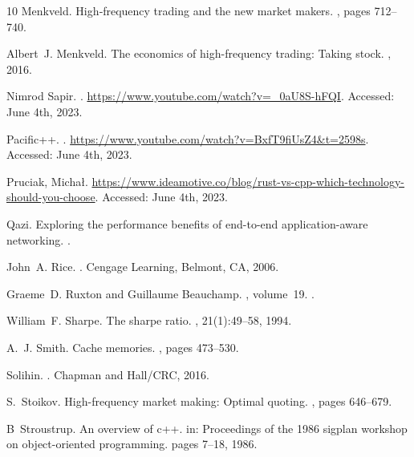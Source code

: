\documentclass{article}
\theoremstyle{break}
\begin{document}
\begin{thebibliography}{10}
Menkveld.
\newblock High‐frequency trading and the new market makers.
, pages 712--740.

Albert~J. Menkveld.
\newblock The economics of high-frequency trading: Taking stock.
, 2016.

{Nimrod Sapir}.
.
\newblock \url{https://www.youtube.com/watch?v=_0aU8S-hFQI}.
\newblock Accessed: June 4th, 2023.

{Pacific++}.
.
\newblock \url{https://www.youtube.com/watch?v=BxfT9fiUsZ4&t=2598s}.
\newblock Accessed: June 4th, 2023.

{Pruciak, Michał}.
\newblock \url{https://www.ideamotive.co/blog/rust-vs-cpp-which-technology-should-you-choose}.
\newblock Accessed: June 4th, 2023.

Qazi.
\newblock Exploring the performance benefits of end-to-end application-aware networking.
.

John~A. Rice.
.
\newblock Cengage Learning, Belmont, CA, 2006.

Graeme~D. Ruxton and Guillaume Beauchamp.
, volume~19.
.

William~F. Sharpe.
\newblock The sharpe ratio.
, 21(1):49--58, 1994.

A.~J. Smith.
\newblock Cache memories.
, pages 473--530.

Solihin.
.
\newblock Chapman and Hall/CRC, 2016.

S.~Stoikov.
\newblock High-frequency market making: Optimal quoting.
, pages 646--679.

B~Stroustrup.
\newblock An overview of c++. in: Proceedings of the 1986 sigplan workshop on object-oriented programming.
\newblock pages 7--18, 1986.


\end{thebibliography}
\end{document}
